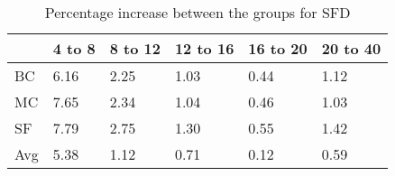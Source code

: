 \begin{table}[H]
	\centering
	\label{tbl:sfd}
	\begin{tabular}{|l|lllll|}\hline
		& 4 to 8 & 8 to 12 & 12 to 16 & 16 to 20 & 20 to 40 \\ \hline
		BC 	& 6.16	& 2.25	& 1.03	& 0.44	& 1.12 \\
		MC  & 7.65	& 2.34	& 1.04	& 0.46	& 1.03 \\
		SF  & 7.79	& 2.75	& 1.30	& 0.55	& 1.42 \\
		Avg	& 5.38	& 1.12	& 0.71	& 0.12	& 0.59 \\ \hline
	\end{tabular}
	\caption{Percentage increase between the groups for SFD}
\end{table}